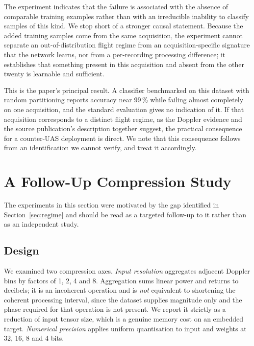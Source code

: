 \documentclass[conference]{IEEEtran}
\begin{document}
The experiment indicates that the failure is associated with the absence of
comparable training examples rather than with an irreducible inability to
classify samples of this kind. We stop short of a stronger causal statement.
Because the added training samples come from the same acquisition, the
experiment cannot separate an out-of-distribution flight regime from an
acquisition-specific signature that the network learns, nor from a
per-recording processing difference; it establishes that something present in
this acquisition and absent from the other twenty is learnable and
sufficient.

This is the paper's principal result. A classifier benchmarked on this
dataset with random partitioning reports accuracy near 99\,\% while failing
almost completely on one acquisition, and the standard evaluation gives no
indication of it. If that acquisition corresponds to a distinct flight
regime, as the Doppler evidence and the source publication's description
together suggest, the practical consequence for a counter-UAS deployment is
direct. We note that this consequence follows from an identification we
cannot verify, and treat it accordingly.

\section{A Follow-Up Compression Study}
\label{sec:compress}

The experiments in this section were motivated by the gap identified in
Section~\ref{sec:regime} and should be read as a targeted follow-up to it
rather than as an independent study.

\subsection{Design}

We examined two compression axes. \emph{Input resolution} aggregates
adjacent Doppler bins by factors of 1, 2, 4 and 8. Aggregation sums linear
power and returns to decibels; it is an incoherent operation and is
\emph{not} equivalent to shortening the coherent processing interval, since
the dataset supplies magnitude only and the phase required for that
operation is not present. We report it strictly as a reduction of input
tensor size, which is a genuine memory cost on an embedded target.
\emph{Numerical precision} applies uniform quantisation to input and weights
at 32, 16, 8 and 4 bits.
\end{document}
